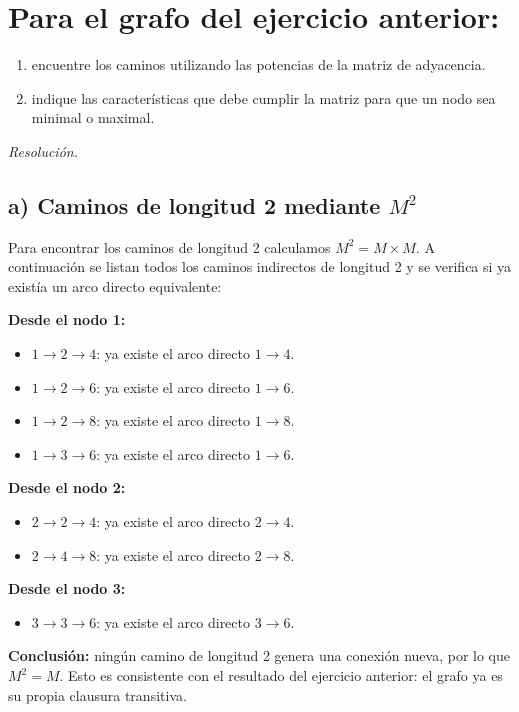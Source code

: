\documentclass[12pt]{article}
\theoremstyle{definition}
\theoremstyle{remark}
\newenvironment{resolucion}{%
    \par\vspace{0.3em}%
    \noindent\textit{Resolución.}\quad
}{%
    \par\vspace{0.8em}%
}
\begin{document}
\section[Potencias de matriz y nodos minimales/maximales]{Para el grafo del ejercicio anterior:}
\begin{enumerate}[label=\alph*)]
\item encuentre los caminos utilizando las potencias de la matriz de adyacencia.
\item indique las características que debe cumplir la matriz para que un nodo sea minimal o maximal.
\end{enumerate}
\begin{resolucion}

\subsection*{a) Caminos de longitud 2 mediante $M^2$}

Para encontrar los caminos de longitud 2 calculamos $M^2 = M \times M$. A continuación se listan todos los caminos indirectos de longitud 2 y se verifica si ya existía un arco directo equivalente:

\textbf{Desde el nodo 1:}
\begin{itemize}
    \item $1 \to 2 \to 4$: ya existe el arco directo $1 \to 4$.
    \item $1 \to 2 \to 6$: ya existe el arco directo $1 \to 6$.
    \item $1 \to 2 \to 8$: ya existe el arco directo $1 \to 8$.
    \item $1 \to 3 \to 6$: ya existe el arco directo $1 \to 6$.
\end{itemize}

\textbf{Desde el nodo 2:}
\begin{itemize}
    \item $2 \to 2 \to 4$: ya existe el arco directo $2 \to 4$.
    \item $2 \to 4 \to 8$: ya existe el arco directo $2 \to 8$.
\end{itemize}

\textbf{Desde el nodo 3:}
\begin{itemize}
    \item $3 \to 3 \to 6$: ya existe el arco directo $3 \to 6$.
\end{itemize}

\textbf{Conclusión:} ningún camino de longitud 2 genera una conexión nueva, por lo que $M^2 = M$. Esto es consistente con el resultado del ejercicio anterior: el grafo ya es su propia clausura transitiva.


\end{resolucion}
\end{document}
